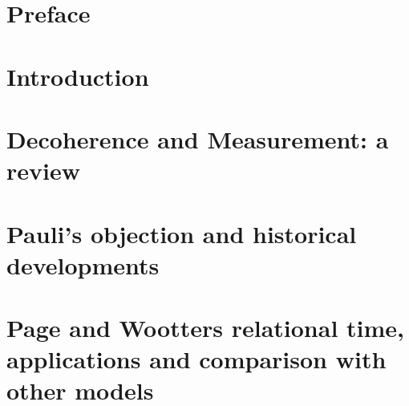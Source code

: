 




\frontmatter

\maketitle

\cleardoublepage
{}
\tableofcontents

\listoffigures

\listoftables

\chapter*{Preface}


\mainmatter

\chapter{Introduction}\label{ch:intro}



\chapter{Decoherence and Measurement: a review}\label{ch:decohere}









\chapter{Pauli's objection and historical developments}\label{ch:hist}






\chapter{Page and Wootters relational time, applications and comparison with other models}
  \label{ch:pw}\label{ch:detect}









